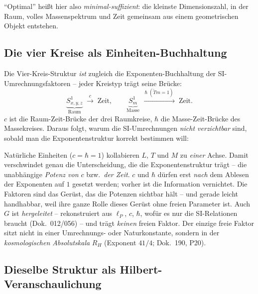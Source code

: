 \noindent
\enquote{Optimal} hei\ss t hier also \emph{minimal-suffizient}: die kleinste
Dimensionszahl, in der Raum, volles Massenspektrum und Zeit gemeinsam aus einem
geometrischen Objekt entstehen.

\subsection{Die vier Kreise als Einheiten-Buchhaltung}

Die Vier-Kreis-Struktur \emph{ist} zugleich die Exponenten-Buchhaltung der
SI-Umrechnungsfaktoren -- jeder Kreistyp tr\"agt seine Br\"ucke:
\[
  \underbrace{S^1_{x,y,z}}_{\text{Raum}}
  \;\xrightarrow{\;c\;}\;\text{Zeit},
  \qquad
  \underbrace{S^1_m}_{\text{Masse}}
  \;\xrightarrow{\;\hbar\;(\tilde T m=1)\;}\;\text{Zeit}.
\]
$c$ ist die Raum-Zeit-Br\"ucke der drei Raumkreise, $\hbar$ die Masse-Zeit-Br\"ucke
des Massekreises. Daraus folgt, warum die SI-Umrechnungen \emph{nicht verzichtbar}
sind, sobald man die Exponentenstruktur korrekt bestimmen will:

\begin{remark}
Nat\"urliche Einheiten ($c=\hbar=1$) kollabieren $L$, $T$ und $M$ zu \emph{einer}
Achse. Damit verschwindet genau die Unterscheidung, die die Exponentenstruktur
tr\"agt -- die unabh\"angige \emph{Potenz von $c$} bzw.\ \emph{der Zeit}. $c$ und
$\hbar$ d\"urfen erst \emph{nach} dem Ablesen der Exponenten auf $1$ gesetzt
werden; vorher ist die Information vernichtet. Die Faktoren sind das Ger\"ust, das
die Potenzen sichtbar h\"alt -- und gerade leicht handhabbar, weil ihre ganze
Rolle dieses Ger\"ust ohne freien Parameter ist. Auch $G$ ist \emph{hergeleitet}
-- rekonstruiert aus $\ell_P$, $c$, $\hbar$, wof\"ur es nur die SI-Relationen
braucht (Dok.~012/056) -- und tr\"agt \emph{keinen} freien Faktor. Der einzige
freie Faktor sitzt nicht in einer Umrechnungs- oder Naturkonstante, sondern in der
\emph{kosmologischen Absolutskala} $R_H$ (Exponent $41/4$; Dok.~190, P20).
\end{remark}

\subsection{Dieselbe Struktur als Hilbert-Veranschaulichung}

